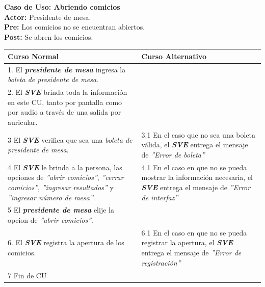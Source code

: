 \documentclass[spanish, 10pt,a4paper]{article}
\numberwithin{equation}{section} %
\begin{document}
\newpage
\noindent\textbf{Caso de Uso: Abriendo comicios}\\
\textbf{Actor: } Presidente de mesa.\\
\textbf{Pre: } Los comicios no se encuentran abiertos.\\
\textbf{Post: } Se abren los comicios.\\
\begin{table}[H]
  \centering
\bgroup
\def\arraystretch{1.3}
  \begin{tabular}{p{9cm} | p{7cm}}
    \hline
    Curso Normal & Curso Alternativo \\
    \hline
    \hline    
    1. El \textbf{\textit{presidente de mesa}} ingresa la \textit{boleta de presidente de mesa}. 
    & \\
    
    \hline
    2. El \textbf{\textit{SVE}} brinda toda la información en este CU, tanto por pantalla como por audio a través de una salida por auricular.
    &
    \\
    
    \hline
    3 El \textbf{\textit{SVE}} verifica que sea una \textit{boleta de presidente de mesa}.
    & 
    3.1 En el caso que no sea una boleta válida, el \textbf{\textit{SVE}} entrega el mensaje de \textit{''Error de boleta''}
    \\
    
    \hline
    4 El \textbf{\textit{SVE}} le brinda a la persona, las opciones de \textit{''abrir comicios''}, \textit{''cerrar comicios''}, \textit{''ingresar resultados''} y \textit{''ingresar número de mesa''}.
    & 
    4.1 En el caso en que no se pueda mostrar la información necesaria, el \textbf{\textit{SVE}} entrega el mensaje de \textit{''Error de interfaz''}
    \\
    
    \hline
    5 El \textbf{\textit{presidente de mesa}} elije la opcion de \textit{''abrir comicios''}.
    & \\
    
    \hline
    6. El \textbf{\textit{SVE}} registra la apertura de los comicios.
    &
    6.1 En el caso en que no se pueda registrar la apertura, el \textbf{\textit{SVE}} entrega el mensaje de \textit{''Error de registración''}
    \\
    
    \hline
    7 Fin de CU
    & \\
    \hline
  \end{tabular}
\egroup
\end{table}
\end{document}
